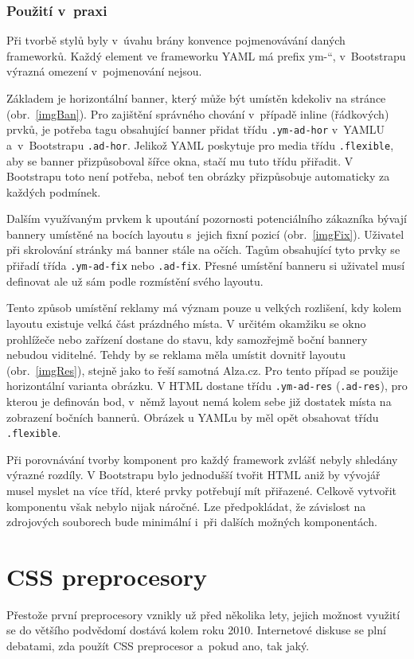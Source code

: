 \documentclass[thesis=B,czech]{FITthesis}[2012/06/26]
\begin{document}
\subsection{Použití v~praxi}
Při tvorbě stylů byly v~úvahu brány konvence pojmenovávání daných frameworků. Každý element ve frameworku YAML má prefix \quotedblbase ym-\textquotedblleft , v~Bootstrapu výrazná omezení v~pojmenování nejsou. 

Základem je horizontální banner, který může být umístěn kdekoliv na stránce (obr.~\ref{imgBan}). Pro zajištění správného chování v~případě inline (řádkových) prvků, je potřeba tagu obsahující banner přidat třídu \verb#.ym-ad-hor# v~YAMLU a~v~Bootstrapu \verb#.ad-hor#. Jelikož YAML poskytuje pro media třídu \verb#.flexible#, aby se banner přizpůsoboval šířce okna, stačí mu tuto třídu přiřadit. V Bootstrapu toto není potřeba, neboť ten obrázky přizpůsobuje automaticky za každých podmínek.



Dalším využívaným prvkem k upoutání pozornosti potenciálního zákazníka bývají bannery umístěné na bocích layoutu s~jejich fixní pozicí (obr.~\ref{imgFix}). Uživatel při skrolování stránky má banner stále na očích. Tagům obsahující tyto prvky se přiřadí třída \verb#.ym-ad-fix# nebo \verb#.ad-fix#. Přesné umístění banneru si uživatel musí definovat ale už sám podle rozmístění svého layoutu. 


Tento způsob umístění reklamy má význam pouze u velkých rozlišení, kdy kolem layoutu existuje velká část prázdného místa. V určitém okamžiku se okno prohlížeče nebo zařízení dostane do stavu, kdy samozřejmě boční bannery nebudou viditelné. Tehdy by se reklama měla umístit dovnitř layoutu (obr.~\ref{imgRes}), stejně jako to řeší samotná Alza.cz. Pro tento případ se použije horizontální varianta obrázku. V HTML dostane třídu \verb#.ym-ad-res# (\verb#.ad-res#), pro kterou je definován bod, v~němž layout nemá kolem sebe již dostatek místa na zobrazení bočních bannerů. Obrázek u YAMLu by měl opět obsahovat třídu \verb#.flexible#.


Při porovnávání tvorby komponent pro každý framework zvlášť nebyly shledány výrazné rozdíly. V Bootstrapu bylo jednodušší tvořit HTML aniž by vývojář musel myslet na více tříd, které prvky potřebují mít přiřazené. Celkově vytvořit komponentu však nebylo nijak náročné. Lze předpokládat, že závislost na zdrojových souborech bude minimální i~při dalších možných komponentách.


\chapter{CSS preprocesory}
Přestože první preprocesory vznikly už před několika lety, jejich možnost využití se do většího podvědomí dostává kolem roku 2010. Internetové diskuse se plní debatami, zda použít CSS preprocesor a~pokud ano, tak jaký. 
\end{document}
